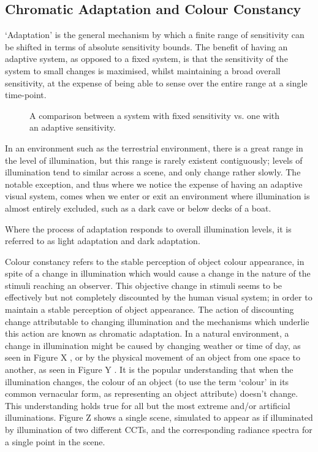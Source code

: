 \subsection{Chromatic Adaptation and Colour Constancy}
`Adaptation' is the general mechanism by which a finite range of sensitivity can be shifted in terms of absolute sensitivity bounds. The benefit of having an adaptive system, as opposed to a fixed system, is that the sensitivity of the system to small changes is maximised, whilst maintaining a broad overall sensitivity, at the expense of being able to sense over the entire range at a single time-point. 

\begin{figure}[htbp]
\caption{A comparison between a system with fixed sensitivity vs. one with an adaptive sensitivity.}
\label{fig:adaptation}
\end{figure}

In an environment such as the terrestrial environment, there is a great range in the level of illumination, but this range is rarely existent contiguously; levels of illumination tend to similar across a scene, and only change rather slowly. The notable exception, and thus where we notice the expense of having an adaptive visual system, comes when we enter or exit an environment where illumination is almost entirely excluded, such as a dark cave or below decks of a boat. 

Where the process of adaptation responds to overall illumination levels, it is referred to as light adaptation and dark adaptation. 


Colour constancy refers to the stable perception of object colour appearance, in spite of a change in illumination which would cause a change in the nature of the stimuli reaching an observer. This objective change in stimuli seems to be effectively but not completely discounted by the human visual system; in order to maintain a stable perception of object appearance. The action of discounting change attributable to changing illumination and the mechanisms which underlie this action are known as chromatic adaptation. 
In a natural environment, a change in illumination might be caused by changing weather or time of day, as seen in Figure X%
, or by the physical movement of an object from one space to another, as seen in Figure Y%
. It is the popular understanding that when the illumination changes, the colour of an object (to use the term `colour' in its common vernacular form, as representing an object attribute) doesn't change. This understanding holds true for all but the most extreme and/or artificial illuminations. Figure Z%
shows a single scene, simulated to appear as if illuminated by illumination of two different \glspl{CCT}, and the corresponding radiance spectra for a single point in the scene.

